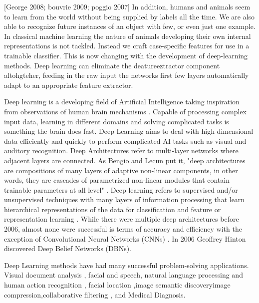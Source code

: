 [George 2008; bouvrie 2009; poggio 2007]
In addition, humans and animals seem to learn from the world without being supplied by labels all the time.
We are also able to recognize future instances of an object with few, or even just one example.
In classical machine learning the nature of animals developing their own internal representations is not tackled\citep{lecun2010convolutional}.
Instead we craft case-specific features for use in a trainable classifier.
This is now changing with the development of deep-learning methods.
Deep learning can eliminate the deatureeztractor component altohgteher, feeding in the raw input the networks first few layers automatically adapt to an appropriate feature extractor\citep{lecun1995convolutional}.


Deep learning is a developing field of Artificial Intelligence taking inspiration from observations of human brain mechanisms \citep{mo2012survey} \citep{chen2014big}.
Capable of processing complex input data, learning in different domains and solving complicated tasks is something the brain does fast.
Deep Learning aims to deal with high-dimensional data efficiently and quickly to perform complicated AI tasks such as visual and auditory recognition.
Deep Architectures refer to multi-layer networks where adjacent layers are connected.
As Bengio and Lecun put it,
"deep architectures are compositions of many layers of adaptive non-linear components, in other words, they are cascades of parametrized non-linear modules that contain trainable parameters at all level" \citep{bengio2007scaling}.
Deep learning refers to supervised and/or unsupervised techniques with many layers of information processing that learn hierarchical representations of the data for classification and feature or representation learning\citep{chen2014big} \citep{dengthree}.          
While there were multiple deep architectures before 2006, almost none were successful is terms of accuracy and efficiency with the exception of Convolutional Neural Networks (CNNs) \citep{lecun1995convolutional}.
In 2006 Geoffrey Hinton discovered Deep Belief Networks (DBNs)\citep{hinton2006fast}.

Deep Learning methods have had many successful problem-solving applications.
Visual document analysis \citep{simard2003best} \citep{karnowski2010deep}, facial\citep{le2013building}\citep{farfade2015multi} and speech, natural language processing and human action recognition \citep{ji20133d}\citep{mo2012survey}, facial location \citep{liu2014deep},image semantic discovery\citep{liu2014deep}image compression\citep{goyal2014object},collaborative filtering \citep{chen2014big}, and Medical Diagnosis\citep{goyal2014object}.


